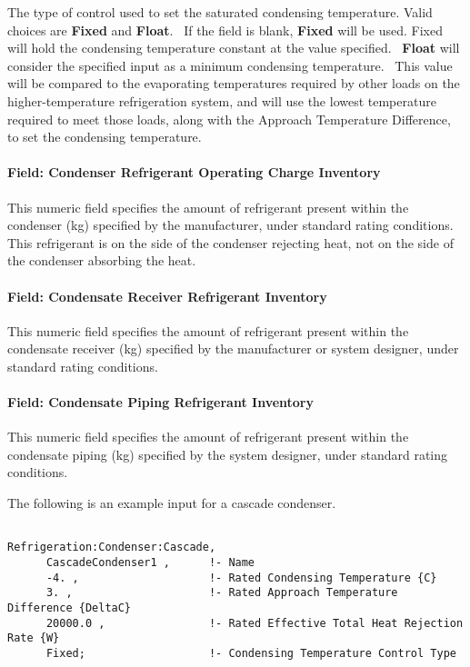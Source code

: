 The type of control used to set the saturated condensing temperature. Valid choices are \textbf{Fixed} and \textbf{Float}.~ If the field is blank, \textbf{Fixed} will be used. Fixed will hold the condensing temperature constant at the value specified.~ \textbf{Float} will consider the specified input as a minimum condensing temperature.~ This value will be compared to the evaporating temperatures required by other loads on the higher-temperature refrigeration system, and will use the lowest temperature required to meet those loads, along with the Approach Temperature Difference, to set the condensing temperature.

\paragraph{Field: Condenser Refrigerant Operating Charge Inventory}\label{field-condenser-refrigerant-operating-charge-inventory-3}

This numeric field specifies the amount of refrigerant present within the condenser (kg) specified by the manufacturer, under standard rating conditions. This refrigerant is on the side of the condenser rejecting heat, not on the side of the condenser absorbing the heat.

\paragraph{Field: Condensate Receiver Refrigerant Inventory}\label{field-condensate-receiver-refrigerant-inventory-3}

This numeric field specifies the amount of refrigerant present within the condensate receiver (kg) specified by the manufacturer or system designer, under standard rating conditions.

\paragraph{Field: Condensate Piping Refrigerant Inventory}\label{field-condensate-piping-refrigerant-inventory-3}

This numeric field specifies the amount of refrigerant present within the condensate piping (kg) specified by the system designer, under standard rating conditions.

The following is an example input for a cascade condenser.

\begin{lstlisting}

Refrigeration:Condenser:Cascade,
      CascadeCondenser1 ,      !- Name
      -4. ,                    !- Rated Condensing Temperature {C}
      3. ,                     !- Rated Approach Temperature Difference {DeltaC}
      20000.0 ,                !- Rated Effective Total Heat Rejection Rate {W}
      Fixed;                   !- Condensing Temperature Control Type
\end{lstlisting}

